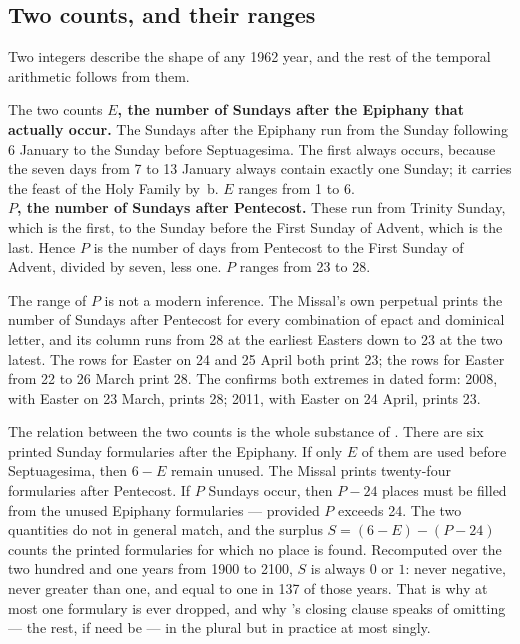 \subsection{Two counts, and their ranges}

Two integers describe the shape of any 1962 year, and the rest of the temporal arithmetic
follows from them.

\begin{studybox}{The two counts}
\textbf{$E$, the number of Sundays after the Epiphany that actually occur.} The Sundays after
the Epiphany run from the Sunday following 6 January to the Sunday before Septuagesima. The
first always occurs, because the seven days from 7 to 13 January always contain exactly one
Sunday; it carries the feast of the Holy Family by \,b. $E$ ranges from 1 to 6.\\[0.4em]
\textbf{$P$, the number of Sundays after Pentecost.} These run from Trinity Sunday, which is the
first, to the Sunday before the First Sunday of Advent, which is the last. Hence $P$ is the
number of days from Pentecost to the First Sunday of Advent, divided by seven, less one.
$P$ ranges from 23 to 28.
\end{studybox}

The range of $P$ is not a modern inference. The Missal's own perpetual  prints the number of Sundays after Pentecost for every combination of epact
and dominical letter, and its column runs from 28 at the earliest Easters down to 23 at the two
latest. The rows for Easter on 24 and 25 April both print 23; the rows for Easter from 22 to
26 March print 28. The  confirms both extremes in dated form: 2008,
with Easter on 23 March, prints 28; 2011, with Easter on 24 April, prints 23.

The relation between the two counts is the whole substance of . There are six printed
Sunday formularies after the Epiphany. If only $E$ of them are used before Septuagesima, then
$6 - E$ remain unused. The Missal prints twenty-four formularies after Pentecost. If $P$
Sundays occur, then $P - 24$ places must be filled from the unused Epiphany formularies —
provided $P$ exceeds 24. The two quantities do not in general match, and the surplus
$S = (6 - E) - (P - 24)$
counts the printed formularies for which no place is found. Recomputed over the two hundred and
one years from 1900 to 2100, $S$ is always $0$ or $1$: never negative, never greater than one,
and equal to one in 137 of those years. That is why at most one formulary is ever dropped, and
why 's closing clause speaks of omitting  — the rest, if need
be — in the plural but in practice at most singly.

